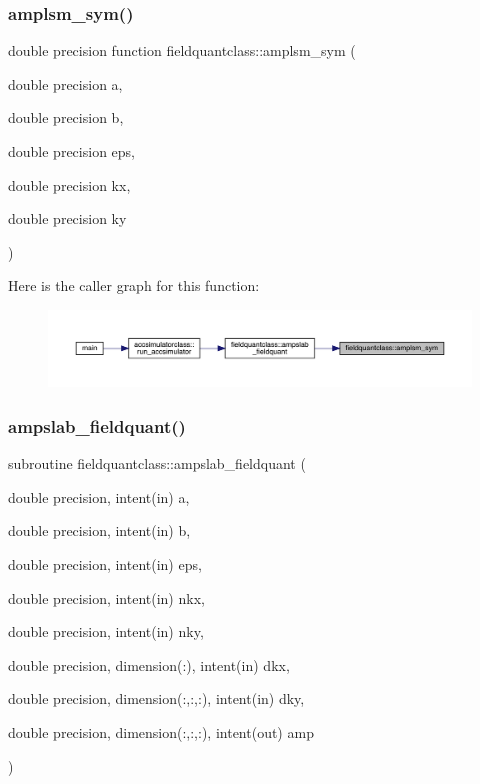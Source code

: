 \subsubsection{\texorpdfstring{amplsm\_sym()}{amplsm\_sym()}}
{\footnotesize\ttfamily double precision function fieldquantclass\+::amplsm\+\_\+sym (\begin{DoxyParamCaption}\item[{double precision}]{a,  }\item[{double precision}]{b,  }\item[{double precision}]{eps,  }\item[{double precision}]{kx,  }\item[{double precision}]{ky }\end{DoxyParamCaption})}

Here is the caller graph for this function\+:\nopagebreak
\begin{figure}[H]
\begin{center}
\leavevmode
\includegraphics[width=350pt]{namespacefieldquantclass_aaf0193e68163e6fb2bba0a9477f19cb0_icgraph}
\end{center}
\end{figure}
\mbox{\label{namespacefieldquantclass_ac5166a3094bb6567db04903c1f43e4b6}} 
\subsubsection{\texorpdfstring{ampslab\_fieldquant()}{ampslab\_fieldquant()}}
{\footnotesize\ttfamily subroutine fieldquantclass\+::ampslab\+\_\+fieldquant (\begin{DoxyParamCaption}\item[{double precision, intent(in)}]{a,  }\item[{double precision, intent(in)}]{b,  }\item[{double precision, intent(in)}]{eps,  }\item[{double precision, intent(in)}]{nkx,  }\item[{double precision, intent(in)}]{nky,  }\item[{double precision, dimension(\+:), intent(in)}]{dkx,  }\item[{double precision, dimension(\+:,\+:,\+:), intent(in)}]{dky,  }\item[{double precision, dimension(\+:,\+:,\+:), intent(out)}]{amp }\end{DoxyParamCaption})}

